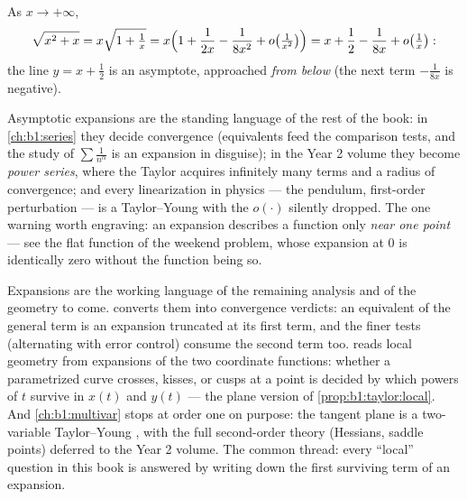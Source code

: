 \begin{example}\label{ex:b1:taylor:asymptote}
As $x \to +\infty$,
\[
\sqrt{x^2 + x} = x\sqrt{1 + \tfrac1x}
= x\Bigl(1 + \frac{1}{2x} - \frac{1}{8x^2} + o\bigl(\tfrac{1}{x^2}\bigr)\Bigr)
= x + \frac12 - \frac{1}{8x} + o\bigl(\tfrac 1x\bigr):
\]
the line $y = x + \frac12$ is an asymptote, approached \emph{from
below} (the next term $-\frac{1}{8x}$ is negative).
\end{example}

\begin{remark}
Asymptotic expansions are the standing language of the rest of
the book: in \cref{ch:b1:series} they decide convergence
(equivalents feed the comparison tests, and the study of $\sum
\frac{1}{n^\alpha}$ is an expansion in disguise); in the Year 2
volume they become \emph{power series}, where the Taylor
 acquires infinitely many terms and a radius of
convergence; and every linearization in physics --- the pendulum,
first-order perturbation --- is a Taylor--Young  with
the $o(\cdot)$ silently dropped. The one warning worth engraving:
an expansion describes a function only \emph{near one point} ---
see the flat function of the weekend problem, whose expansion at
$0$ is identically zero without the function being so.
\end{remark}

\begin{remark}
Expansions are the working language of the remaining analysis
and of the geometry to come.  converts them
into convergence verdicts: an equivalent of the general term is
an expansion truncated at its first term, and the finer tests
(alternating with error control) consume the second term too.
 reads local geometry from expansions of the
two coordinate functions: whether a parametrized curve crosses,
kisses, or cusps at a point is decided by which powers of $t$
survive in $x(t)$ and $y(t)$ --- the plane version of
\cref{prop:b1:taylor:local}. And \cref{ch:b1:multivar} stops at
order one on purpose: the tangent plane is a two-variable
Taylor--Young , with the full second-order theory
(Hessians, saddle points) deferred to the Year 2 volume. The
common thread: every ``local'' question in this book is answered
by writing down the first surviving term of an expansion.
\end{remark}

